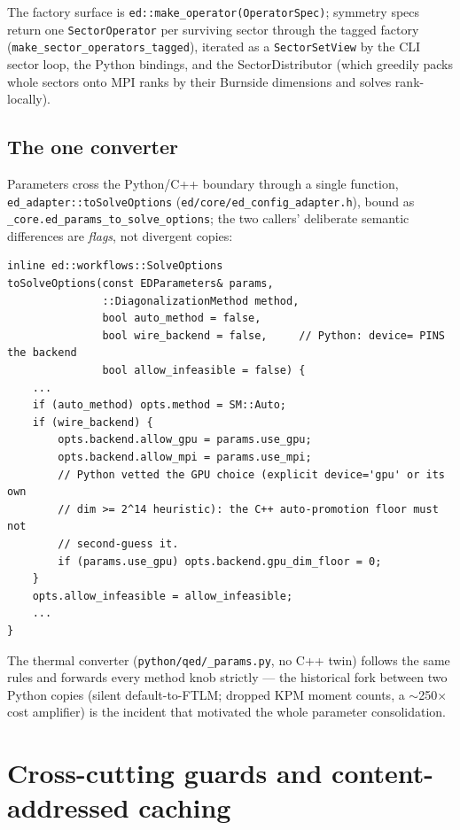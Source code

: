 \documentclass[11pt]{article}
\newcommand{\file}[1]{\texttt{\small #1}}
\begin{document}
The factory surface is \texttt{ed::make\_operator(OperatorSpec)}; symmetry
specs return one \texttt{SectorOperator} per surviving sector through the
tagged factory (\texttt{make\_sector\_operators\_tagged}), iterated as a
\texttt{SectorSetView} by the CLI sector loop, the Python bindings, and
the SectorDistributor (which greedily packs whole sectors onto MPI ranks
by their Burnside dimensions and solves rank-locally).

\subsection{The one converter}

Parameters cross the Python/C++ boundary through a single function,
\texttt{ed\_adapter::toSolveOptions} (\file{ed/core/ed\_config\_adapter.h}),
bound as \texttt{\_core.ed\_params\_to\_solve\_options}; the two callers'
deliberate semantic differences are \emph{flags}, not divergent copies:

\begin{lstlisting}
inline ed::workflows::SolveOptions
toSolveOptions(const EDParameters& params,
               ::DiagonalizationMethod method,
               bool auto_method = false,
               bool wire_backend = false,     // Python: device= PINS the backend
               bool allow_infeasible = false) {
    ...
    if (auto_method) opts.method = SM::Auto;
    if (wire_backend) {
        opts.backend.allow_gpu = params.use_gpu;
        opts.backend.allow_mpi = params.use_mpi;
        // Python vetted the GPU choice (explicit device='gpu' or its own
        // dim >= 2^14 heuristic): the C++ auto-promotion floor must not
        // second-guess it.
        if (params.use_gpu) opts.backend.gpu_dim_floor = 0;
    }
    opts.allow_infeasible = allow_infeasible;
    ...
}
\end{lstlisting}

The thermal converter (\file{python/qed/\_params.py}, no C++ twin) follows
the same rules and forwards every method knob strictly --- the historical
fork between two Python copies (silent default-to-FTLM; dropped KPM
moment counts, a $\sim$250$\times$ cost amplifier) is the incident that
motivated the whole parameter consolidation.

\section{Cross-cutting guards and content-addressed caching}
\label{sec:guards}
\end{document}
